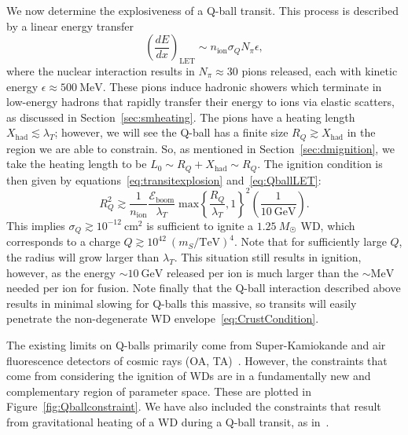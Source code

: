 \documentclass[preprintnumbers,amsmath,amssymb,prd,superscriptaddress]{revtex4}
\newcommand{\Eboom}{\mathcal{E}_\text{boom}}
\newcommand{\GeV}{\text{GeV}}
\newcommand{\MeV}{\text{MeV}}
\newcommand{\xmax}{\text{max}}
\def\r{\right)}
\def\l{\left(}
\begin{document}
We now determine the explosiveness of a Q-ball transit.
This process is described by a linear energy transfer
\begin{equation}
\label{eq:QballLET}
\l\frac{dE}{dx}\r_\text{LET} \sim n_\text{ion} \sigma_Q N_\pi \epsilon,
\end{equation}
where the nuclear interaction results in $N_\pi \approx 30$ pions released, each with kinetic energy $\epsilon \approx 500 ~\text{MeV}$.
These pions induce hadronic showers which terminate in low-energy hadrons that rapidly transfer their energy to ions via elastic scatters, as discussed in Section~\ref{sec:smheating}.
The pions have a heating length $X_\text{had} \lesssim \lambda_T$; however, we will see the Q-ball has a finite size $R_Q \gtrsim X_\text{had}$ in the region we are able to constrain.
So, as mentioned in Section~\ref{sec:dmignition}, we take the heating length to be $L_0 \sim R_Q + X_\text{had} \sim R_Q$.
The ignition condition is then given by equations~\eqref{eq:transitexplosion} and~\eqref{eq:QballLET}:
\begin{equation}
 R_Q^2 \gtrsim \frac{1}{n_\text{ion}} \frac{\Eboom}{\lambda_T}
 \; \xmax\left \{ \frac{R_Q}{\lambda_T}, 1\right\}^2
 \l \frac{1}{10~\GeV} \r.
\end{equation}
This implies $\sigma_Q \gtrsim 10^{-12} ~\text{cm}^2$ is sufficient to ignite a $1.25 ~M_{\astrosun}$ WD, which corresponds to a charge $Q \gtrsim 10^{42} ~(m_S/\text{TeV})^4$.
Note that for sufficiently large $Q$, the radius will grow larger than $\lambda_T$.
This situation still results in ignition, however, as the energy $\sim 10~\GeV$ released per ion is much larger than the $\sim \MeV$ needed per ion for fusion.
Note finally that the Q-ball interaction described above results in minimal slowing for Q-balls this massive, so transits will easily penetrate the non-degenerate WD envelope~\eqref{eq:CrustCondition}.

The existing limits on Q-balls primarily come from Super-Kamiokande and air fluorescence detectors of cosmic rays (OA, TA)~\cite{Dine:2003ax}.
However, the constraints that come from considering the ignition of WDs are in a fundamentally new and complementary region of parameter space.
These are plotted in Figure~\ref{fig:Qballconstraint}.
We have also included the constraints that result from gravitational heating of a WD during a Q-ball transit, as in~\cite{Graham:2015apa}.
\end{document}
